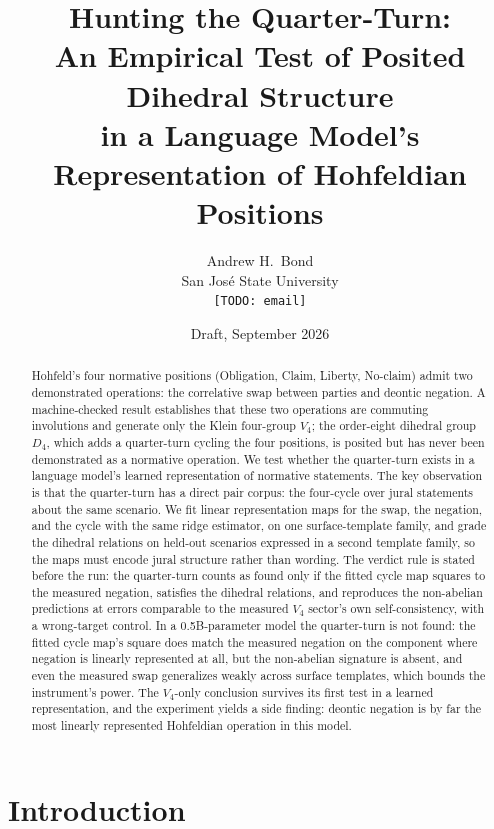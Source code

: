 \documentclass[11pt]{article}
\title{Hunting the Quarter-Turn:\\ An Empirical Test of Posited Dihedral Structure\\ in a Language Model's Representation of Hohfeldian Positions}
\author{Andrew H.\ Bond\\ San Jos\'e State University\\ \texttt{[TODO: email]}}
\date{Draft, September 2026}
\begin{document}
\maketitle

\begin{abstract}
Hohfeld's four normative positions (Obligation, Claim, Liberty, No-claim) admit two
demonstrated operations: the correlative swap between parties and deontic negation. A
machine-checked result establishes that these two operations are commuting involutions and
generate only the Klein four-group $V_4$; the order-eight dihedral group $D_4$, which adds a
quarter-turn cycling the four positions, is posited but has never been demonstrated as a
normative operation. We test whether the quarter-turn exists in a language model's learned
representation of normative statements. The key observation is that the quarter-turn has a
direct pair corpus: the four-cycle over jural statements about the same scenario. We fit
linear representation maps for the swap, the negation, and the cycle with the same ridge
estimator, on one surface-template family, and grade the dihedral relations on held-out
scenarios expressed in a second template family, so the maps must encode jural structure
rather than wording. The verdict rule is stated before the run: the quarter-turn counts as
found only if the fitted cycle map squares to the measured negation, satisfies the dihedral
relations, and reproduces the non-abelian predictions at errors comparable to the measured
$V_4$ sector's own self-consistency, with a wrong-target control. In a 0.5B-parameter model the quarter-turn is
not found: the fitted cycle map's square does match the measured negation on the component
where negation is linearly represented at all, but the non-abelian signature is absent, and
even the measured swap generalizes weakly across surface templates, which bounds the
instrument's power. The $V_4$-only conclusion survives its first test in a learned
representation, and the experiment yields a side finding: deontic negation is by far the
most linearly represented Hohfeldian operation in this model.
\end{abstract}

\section{Introduction}
\end{document}
